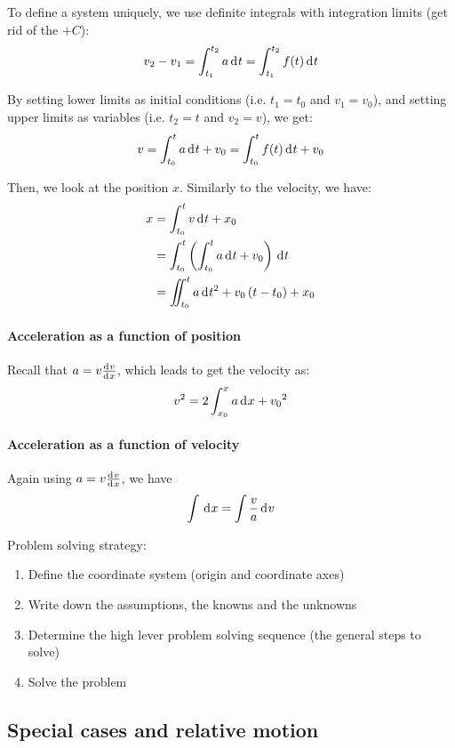 \documentclass[10pt, twocolumn]{article}
\begin{document}
To define a system uniquely, we use definite integrals with integration limits (get rid of the \(+ C\)):
\[
  v_2 - v_1 = \int_{t_1}^{t_2}{a \,\mathrm{d}^{} t} = \int_{t_1}^{t_2}{f(t) \,\mathrm{d}^{} t}
\]

By setting lower limits as initial conditions (i.e. \(t_1 = t_0\) and \(v_1 = v_0\)), and setting upper limits as variables (i.e. \(t_2 = t\) and \(v_2 = v\)), we get:
\[
  v = \int_{t_0}^t {a \,\mathrm{d}^{} t} + v_0 = \int_{t_0}^t {f(t) \,\mathrm{d}^{} t} + v_0
\]

Then, we look at the position \(x\).
Similarly to the velocity, we have:
\begin{align*}
  x & = \int_{t_0}^t {v \,\mathrm{d}^{} t} + x_0                                           \\
    & = \int_{t_0}^t {\left( \int_{t_0}^t {a \,\mathrm{d}^{} t} + v_0 \right) \,\mathrm{d}^{} t} \\
    & = \iint_{t_0}^t {a \,\mathrm{d}^{} t^2} + v_0 \left( t - t_0 \right) + x_0
\end{align*}

\paragraph{Acceleration as a function of position}
Recall that \(a = v \frac{\mathrm{d}^{} v}{\mathrm{d}^{} x}\), which leads to get the velocity as:
\[
  v^2 = 2\int_{x_0}^x {a \,\mathrm{d}^{} x} + {v_0}^2
\]

\paragraph{Acceleration as a function of velocity}
Again using \(a = v \frac{\mathrm{d}^{} v}{\mathrm{d}^{} x}\), we have
\[
  \int{\,\mathrm{d}^{} x} = \int{\frac{v}{a} \,\mathrm{d}^{} v}
\]

Problem solving strategy:
\begin{enumerate}
  \item Define the coordinate system (origin and coordinate axes)
  \item Write down the assumptions, the knowns and the unknowns
  \item Determine the high lever problem solving sequence (the general steps to solve)
  \item Solve the problem
\end{enumerate}


\subsection{Special cases and relative motion}
\end{document}
